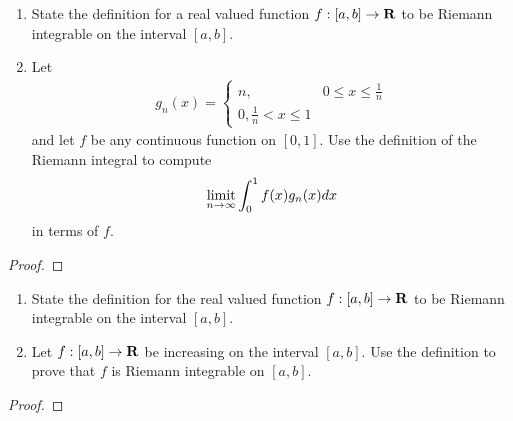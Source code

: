 \documentclass[11pt,twoside,openany]{memoir}
\begin{document}
\newpage
\fancyhead[L]{\scalebox{0.9}{Integration}}
\fancyhead[R]{\scalebox{0.9}{Appeared on: F16}}
\begin{problem}
    \phantom{a}
    \begin{enumerate}[label = (\arabic*)]
        \item State the definition for a real valued function $f:[a,b] \rightarrow \mathbf{R}$ to be Riemann integrable on the interval $[a,b]$.
        \item Let 
            \begin{equation*}
            \begin{split}
                g_n(x) = \begin{cases}
                    n, &0 \leq x \leq \frac{1}{n} \\
                    0, \frac{1}{n} < x \leq 1 
                \end{cases}
            \end{split}
            \end{equation*}
        and let $f$ be any continuous function on $[0,1]$. Use the definition of the Riemann integral to compute 
            \begin{equation*}
            \begin{split}
                \operatorname*{limit}_{n \rightarrow \infty}\int_0^1 f(x) g_n(x)dx 
            \end{split}
            \end{equation*}
        in terms of $f$.
    \end{enumerate}
\end{problem}
\begin{proof}
\end{proof}

\newpage
\fancyhead[L]{\scalebox{0.9}{Integration}}
\fancyhead[R]{\scalebox{0.9}{Appeared on: F15}}
\begin{problem}
    \phantom{a}
    \begin{enumerate}[label = (\arabic*)]
        \item State the definition for the real valued function $f:[a,b] \rightarrow \mathbf{R}$ to be Riemann integrable on the interval $[a,b]$.
        \item Let $f:[a,b] \rightarrow \mathbf{R}$ be increasing on the interval $[a,b]$. Use the definition to prove that $f$ is Riemann integrable on $[a,b]$.
    \end{enumerate}
\end{problem}
\begin{proof}
\end{proof}
\end{document}
